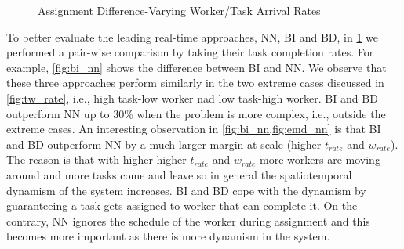 \begin{figure}[h]
	\centering
	\caption{\small{Assignment Difference-Varying Worker/Task Arrival Rates}}\label{fig:rate_comp}
\end{figure}

To better evaluate the leading real-time approaches, NN, BI and BD, in \cref{fig:rate_comp} we performed a pair-wise comparison by taking their task completion rates. For example, \cref{fig:bi_nn} shows the difference between BI and NN. We observe that these three approaches perform similarly in the two extreme cases discussed in \cref{fig:tw_rate}, i.e., high task-low worker nad low task-high worker. BI and BD outperform NN up to 30\% when the problem is more complex, i.e., outside the extreme cases. An interesting observation in \cref{fig:bi_nn,fig:emd_nn} is that BI and BD outperform NN by a much larger margin at scale (higher $t_{rate}$ and $w_{rate}$). The reason is that with higher higher $t_{rate}$ and $w_{rate}$ more workers are moving around and more tasks come and leave so in general the spatiotemporal dynamism of the system increases. BI and BD cope with the dynamism by guaranteeing a task gets assigned to worker that can complete it. On the contrary, NN ignores the schedule of the worker during assignment and this becomes more important as there is more dynamism in the system.

